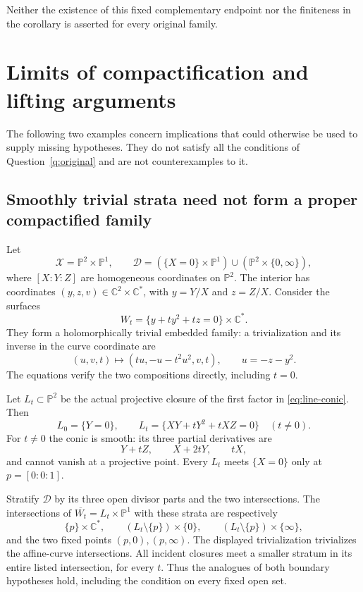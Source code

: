 \documentclass[11pt]{article}
\newcommand{\C}{\mathbb C}
\newcommand{\PP}{\mathbb P}
\newcommand{\cl}[1]{\overline{#1}}
\theoremstyle{definition}
\theoremstyle{remark}
\begin{document}
Neither the existence of this fixed complementary endpoint nor the finiteness in the corollary is asserted for every original family.

\section{Limits of compactification and lifting arguments}\label{sec:limits}

The following two examples concern implications that could otherwise be used to supply missing hypotheses. They do not satisfy all the conditions of Question~\ref{q:original} and are not counterexamples to it.

\subsection{Smoothly trivial strata need not form a proper compactified family}

Let
\[
 \mathcal X=\PP^2\times\PP^1,\qquad
 \mathcal D=(\{X=0\}\times\PP^1)\cup(\PP^2\times\{0,\infty\}),
\]
where $[X:Y:Z]$ are homogeneous coordinates on $\PP^2$. The interior has coordinates $(y,z,v)\in\C^2\times\C^*$, with $y=Y/X$ and $z=Z/X$. Consider the surfaces
\begin{equation}\label{eq:line-conic}
 W_t=\{y+t y^2+t z=0\}\times\C^*.
\end{equation}
They form a holomorphically trivial embedded family: a trivialization and its inverse in the curve coordinate are
\[
 (u,v,t)\longmapsto(tu,-u-t^2u^2,v,t),
 \qquad u=-z-y^2.
\]
The equations verify the two compositions directly, including $t=0$.

Let $L_t\subset\PP^2$ be the actual projective closure of the first factor in \eqref{eq:line-conic}. Then
\[
 L_0=\{Y=0\},\qquad
 L_t=\{XY+tY^2+tXZ=0\}\quad(t\ne0).
\]
For $t\ne0$ the conic is smooth: its three partial derivatives are
\[
 Y+tZ,\qquad X+2tY,\qquad tX,
\]
and cannot vanish at a projective point. Every $L_t$ meets $\{X=0\}$ only at $p=[0:0:1]$.

Stratify $\mathcal D$ by its three open divisor parts and the two intersections. The intersections of $\cl{W_t}=L_t\times\PP^1$ with these strata are respectively
\[
 \{p\}\times\C^*,\qquad
 (L_t\setminus\{p\})\times\{0\},\qquad
 (L_t\setminus\{p\})\times\{\infty\},
\]
and the two fixed points $(p,0),(p,\infty)$. The displayed trivialization trivializes the affine-curve intersections. All incident closures meet a smaller stratum in its entire listed intersection, for every $t$. Thus the analogues of both boundary hypotheses hold, including the condition on every fixed open set.
\end{document}
